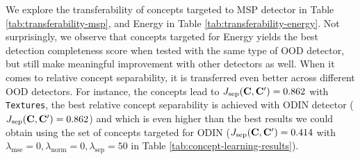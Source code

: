 We explore the transferability of concepts targeted to MSP \cite{hendrycks2016msp} detector in Table \ref{tab:transferability-msp}, and Energy \cite{liu2020energy} in Table \ref{tab:transferability-energy}.
Not surprisingly, we observe that concepts targeted for Energy yields the best detection completeness score when tested with the same type of OOD detector, but still make meaningful improvement with other detectors as well.
When it comes to relative concept separability, it is transferred even better across different OOD detectors. 
For instance, the concepts lead to $J_\textrm{sep}(\mathbf{C}, \mathbf{C}') = 0.862$ with \texttt{Textures}, the best relative concept separability is achieved with ODIN detector (\ie $J_\textrm{sep}(\mathbf{C}, \mathbf{C}') = 0.862$) and which is even higher than the best results we could obtain using the set of concepts targeted for ODIN (\ie $J_\textrm{sep}(\mathbf{C}, \mathbf{C}') = 0.414$ with $\lambda_\textrm{mse} = 0, \lambda_\textrm{norm} = 0, \lambda_\textrm{sep} = 50$ in Table \ref{tab:concept-learning-results}).
